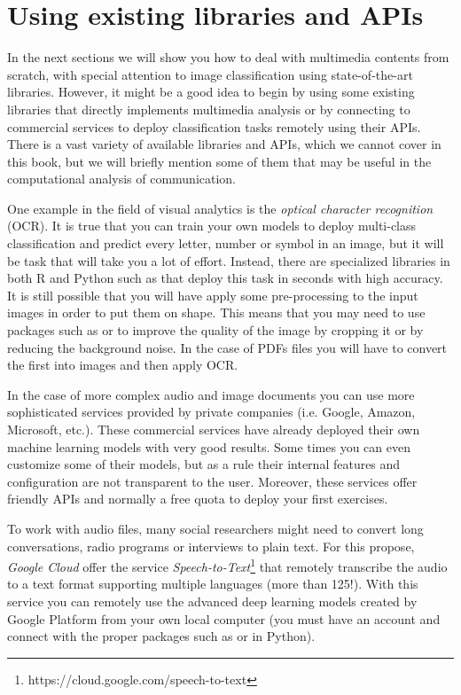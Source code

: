 \section{Using existing libraries and APIs}
\label{sec:apivisions}

In the next sections we will show you how to deal with multimedia contents from scratch, with special attention to image classification using state-of-the-art libraries. However, it might be a good idea to begin by using some existing libraries that directly implements multimedia analysis or by connecting to commercial services to deploy classification tasks remotely using their APIs. There is a vast variety of available libraries and APIs, which we cannot cover in this book, but we will briefly mention some of them that may be useful in the computational analysis of communication.

One example in the field of visual analytics is the \textit{optical character recognition} (OCR). It is true that you can train your own models to deploy multi-class classification and predict every letter, number or symbol in an image, but it will be task that will take you a lot of effort. Instead, there are specialized libraries in both R and Python such as  that deploy this task in seconds with high accuracy. It is still possible that you will have apply some pre-processing to the input images in order to put them on shape. This means that you may need to use packages such as  or  to improve the quality of the image by cropping it or by reducing the background noise.  In the case of PDFs files you will have to convert the first into images and then apply OCR.

In the case of more complex audio and image documents you can use more sophisticated services provided by private companies (i.e. Google, Amazon, Microsoft, etc.). These commercial services have already deployed their own machine learning models with very good results. Some times you can even customize some of their models, but as a rule their internal features and configuration are not transparent to the user. Moreover, these services offer friendly APIs and normally a free quota to deploy your first exercises.

To work with audio files, many social researchers might need to convert long conversations, radio programs or interviews to plain text. For this propose, \textit{Google Cloud} offer the service \textit{Speech-to-Text}\footnote{https://cloud.google.com/speech-to-text}  that remotely transcribe the audio to a text format supporting multiple languages (more than 125!). With this service you can remotely use the advanced deep learning models created by Google Platform from your own local computer (you must have an account and connect with the proper packages such as  or  in Python).

